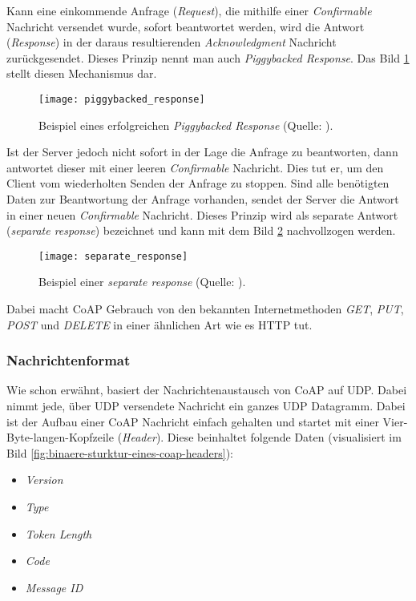 Kann eine einkommende Anfrage (\textit{Request}), die mithilfe einer \textit{Confirmable} Nachricht versendet wurde, sofort beantwortet werden, wird die Antwort (\textit{Response}) in der daraus resultierenden \textit{Acknowledgment} Nachricht zurückgesendet. Dieses Prinzip nennt man auch \textit{Piggybacked Response}. Das Bild \ref{fig:beispiel-eines-erfolgreichen-piggybacked-response} stellt diesen Mechanismus dar.

\begin{figure}[h]
    \centering
    \texttt{[image: piggybacked\_response]}
    \caption{Beispiel eines erfolgreichen \textit{Piggybacked Response} (Quelle: \autocite{RFC7252}).}
    \label{fig:beispiel-eines-erfolgreichen-piggybacked-response}
\end{figure}

Ist der Server jedoch nicht sofort in der Lage die Anfrage zu beantworten, dann antwortet dieser mit einer leeren \textit{Confirmable} Nachricht. Dies tut er, um den Client vom wiederholten Senden der Anfrage zu stoppen. Sind alle benötigten Daten zur Beantwortung der Anfrage vorhanden, sendet der Server die Antwort in einer neuen \textit{Confirmable} Nachricht. Dieses Prinzip wird als separate Antwort (\textit{separate response}) bezeichnet und kann mit dem Bild \ref{fig:beispiel-einer-separate-response} nachvollzogen werden.

\begin{figure}[h]
    \centering
    \texttt{[image: separate\_response]}
    \caption{Beispiel einer \textit{separate response} (Quelle: \autocite{RFC7252}).}
    \label{fig:beispiel-einer-separate-response}
\end{figure}

Dabei macht CoAP Gebrauch von den bekannten Internetmethoden \textit{GET}, \textit{PUT}, \textit{POST} und \textit{DELETE} in einer ähnlichen Art wie es HTTP tut.

\subsubsection{Nachrichtenformat}
\label{subsubsec:nachrichtenformat}

Wie schon erwähnt, basiert der Nachrichtenaustausch von CoAP auf UDP. Dabei nimmt jede, über UDP versendete Nachricht ein ganzes UDP Datagramm. Dabei ist der Aufbau einer CoAP Nachricht einfach gehalten und startet mit einer Vier-Byte-langen-Kopfzeile (\textit{Header}). Diese beinhaltet folgende Daten (visualisiert im Bild \ref{fig:binaere-sturktur-eines-coap-headers}):
\begin{itemize}
    \item \textit{Version}
    \item \textit{Type}
    \item \textit{Token Length}
    \item \textit{Code}
    \item \textit{Message ID}
\end{itemize}

